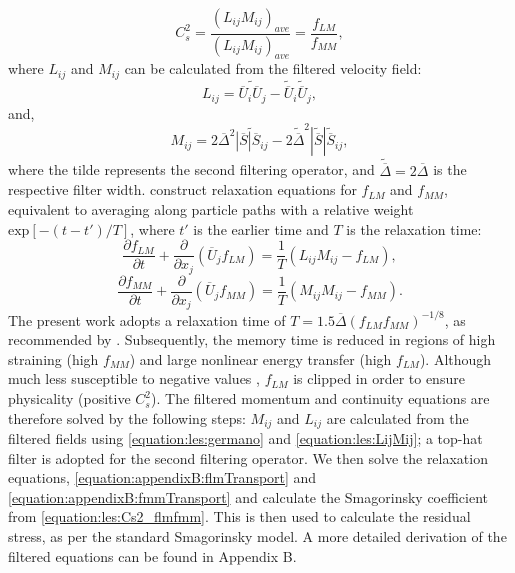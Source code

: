 \documentclass[12pt,oneside,a4paper]{article}
\newcommand{\pdev}[2]{\frac{\partial {#1}}{\partial {#2}}}
\begin{document}
\begin{equation}
\label{equation:les:Cs2_flmfmm}
C_s^2 = \frac{(L_{ij}M_{ij})_{ave}}{(L_{ij}M_{ij})_{ave}} = \frac{f_{LM}}{f_{MM}},
\end{equation}
where $L_{ij}$ and $M_{ij}$ can be calculated from the filtered velocity field:
\begin{equation}
\label{equation:les:germano}
L_{ij}  = \widetilde{\overline{U}_i \overline{U}_j} - \widetilde{\overline{U}}_i \widetilde{\overline{U}}_j,
\end{equation}
and,
\begin{equation}
\label{equation:les:LijMij}
M_{ij} = 2 \overline{\Delta}^2 \widetilde{|\overline{S}|\overline{S}_{ij}} - 2 \widetilde{\overline{\Delta}}^2 |\widetilde{\overline{S}}|\widetilde{\overline{S}}_{ij},
\end{equation}
where the tilde represents the second filtering operator, and $\widetilde{\overline{\Delta}} = 2\overline{\Delta}$ is the respective filter width. \cite{meneveau1996} construct relaxation equations for $f_{LM}$ and $f_{MM}$, equivalent to averaging along particle paths with a relative weight $\text{exp}[-(t-t')/T]$, where $t'$ is the earlier time and $T$ is the relaxation time:
\begin{equation}
\label{equation:les:flmTransport}
\pdev{f_{LM}}{t} + \pdev{}{x_j}(\overline{U}_j f_{LM}) = \frac{1}{T}(L_{ij}M_{ij} - f_{LM}),
\end{equation}
\begin{equation}
\label{equation:les:fmmTransport}
\pdev{f_{MM}}{t} + \pdev{}{x_j}(\overline{U}_j f_{MM}) = \frac{1}{T}(M_{ij}M_{ij} - f_{MM}).
\end{equation}
The present work adopts a relaxation time of $T = 1.5 \overline{\Delta} (f_{LM}f_{MM})^{-1/8}$, as recommended by \cite{meneveau1996}. Subsequently, the memory time is reduced in regions of high straining (high $f_{MM}$) and large nonlinear energy transfer (high $f_{LM}$). Although much less susceptible to negative values \citep{meneveau1996}, $f_{LM}$ is clipped in order to ensure physicality (positive $C_s^2$). The filtered momentum and continuity equations are therefore solved by the following steps: $M_{ij}$ and $L_{ij}$ are calculated from the filtered fields using \eqref{equation:les:germano} and \eqref{equation:les:LijMij}; a top-hat filter is adopted for the second filtering operator. We then solve the relaxation equations, \eqref{equation:appendixB:flmTransport} and \eqref{equation:appendixB:fmmTransport} and calculate the Smagorinsky coefficient from \eqref{equation:les:Cs2_flmfmm}. This is then used to calculate the residual stress, as per the standard Smagorinsky model. A more detailed derivation of the filtered equations can be found in Appendix B.
\end{document}
